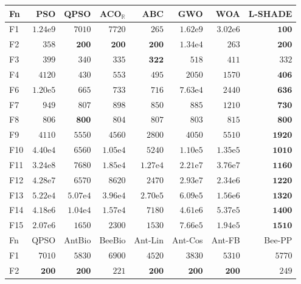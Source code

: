 \begin{tabular}{lrrrrrrr}
\toprule
Fn & PSO & QPSO & ACO$_\mathbb{R}$ & ABC & GWO & WOA & L-SHADE \\
\midrule
F1 & $1.24\mathrm{e}{9}$ & $7010$ & $7720$ & $265$ & $1.62\mathrm{e}{9}$ & $3.02\mathrm{e}{6}$ & $\mathbf{100}$ \\
F2 & $358$ & $\mathbf{200}$ & $\mathbf{200}$ & $\mathbf{200}$ & $1.34\mathrm{e}{4}$ & $263$ & $\mathbf{200}$ \\
F3 & $399$ & $340$ & $335$ & $\mathbf{322}$ & $518$ & $411$ & $332$ \\
F4 & $4120$ & $430$ & $553$ & $495$ & $2050$ & $1570$ & $\mathbf{406}$ \\
F6 & $1.20\mathrm{e}{5}$ & $665$ & $733$ & $716$ & $7.63\mathrm{e}{4}$ & $2440$ & $\mathbf{636}$ \\
F7 & $949$ & $807$ & $898$ & $850$ & $885$ & $1210$ & $\mathbf{730}$ \\
F8 & $806$ & $\mathbf{800}$ & $804$ & $807$ & $803$ & $815$ & $\mathbf{800}$ \\
F9 & $4110$ & $5550$ & $4560$ & $2800$ & $4050$ & $5510$ & $\mathbf{1920}$ \\
F10 & $4.40\mathrm{e}{4}$ & $6560$ & $1.05\mathrm{e}{4}$ & $5240$ & $1.10\mathrm{e}{5}$ & $1.35\mathrm{e}{5}$ & $\mathbf{1010}$ \\
F11 & $3.24\mathrm{e}{8}$ & $7680$ & $1.85\mathrm{e}{4}$ & $1.27\mathrm{e}{4}$ & $2.21\mathrm{e}{7}$ & $3.76\mathrm{e}{7}$ & $\mathbf{1160}$ \\
F12 & $4.28\mathrm{e}{7}$ & $6570$ & $8620$ & $2470$ & $2.93\mathrm{e}{7}$ & $2.34\mathrm{e}{6}$ & $\mathbf{1220}$ \\
F13 & $5.22\mathrm{e}{4}$ & $5.07\mathrm{e}{4}$ & $3.96\mathrm{e}{4}$ & $2.70\mathrm{e}{5}$ & $6.09\mathrm{e}{5}$ & $1.56\mathrm{e}{6}$ & $\mathbf{1320}$ \\
F14 & $4.18\mathrm{e}{6}$ & $1.04\mathrm{e}{4}$ & $1.57\mathrm{e}{4}$ & $7180$ & $4.61\mathrm{e}{6}$ & $5.37\mathrm{e}{5}$ & $\mathbf{1400}$ \\
F15 & $2.07\mathrm{e}{6}$ & $1650$ & $2300$ & $1530$ & $7.66\mathrm{e}{5}$ & $1.94\mathrm{e}{5}$ & $\mathbf{1510}$ \\
\midrule
Fn & QPSO & AntBio & BeeBio & Ant-Lin & Ant-Cos & Ant-FB & Bee-PP \\
\midrule
F1 & $7010$ & $5830$ & $6900$ & $4520$ & $3830$ & $5310$ & $5770$ \\
F2 & $\mathbf{200}$ & $\mathbf{200}$ & $221$ & $\mathbf{200}$ & $\mathbf{200}$ & $\mathbf{200}$ & $249$ \\

\end{tabular}
